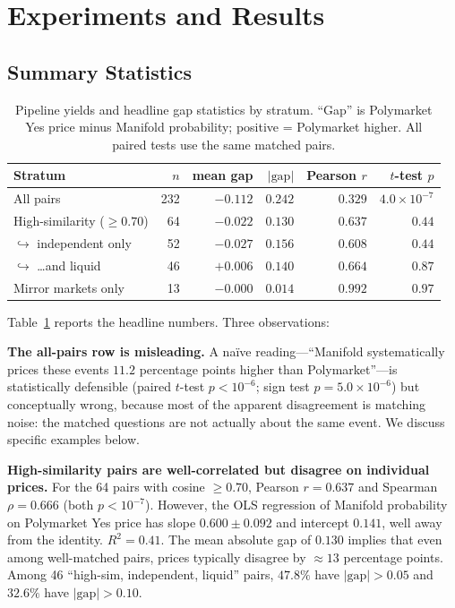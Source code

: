 \documentclass{article}
\begin{document}
\section{Experiments and Results}

\subsection{Summary Statistics}

\begin{table}[t]
\centering
\caption{Pipeline yields and headline gap statistics by stratum. ``Gap'' is Polymarket Yes price minus Manifold probability; positive = Polymarket higher. All paired tests use the same matched pairs.}
\label{tab:counts}
\begin{tabular}{lrrrrr}
\toprule
Stratum & $n$ & mean gap & $|\text{gap}|$ & Pearson $r$ & $t$-test $p$ \\
\midrule
All pairs & 232 & $-0.112$ & $0.242$ & $0.329$ & $4.0\!\times\!10^{-7}$ \\
High-similarity ($\geq 0.70$) & 64 & $-0.022$ & $0.130$ & $0.637$ & $0.44$ \\
\quad $\hookrightarrow$ independent only & 52 & $-0.027$ & $0.156$ & $0.608$ & $0.44$ \\
\quad $\hookrightarrow$ \dots and liquid & 46 & $+0.006$ & $0.140$ & $0.664$ & $0.87$ \\
Mirror markets only & 13 & $-0.000$ & $0.014$ & $0.992$ & $0.97$ \\
\bottomrule
\end{tabular}
\end{table}

Table~\ref{tab:counts} reports the headline numbers. Three observations:

\textbf{The all-pairs row is misleading.} A naïve reading---``Manifold systematically prices these events $11.2$ percentage points higher than Polymarket''---is statistically defensible (paired $t$-test $p < 10^{-6}$; sign test $p = 5.0 \times 10^{-6}$) but conceptually wrong, because most of the apparent disagreement is matching noise: the matched questions are not actually about the same event. We discuss specific examples below.

\textbf{High-similarity pairs are well-correlated but disagree on individual prices.} For the 64 pairs with cosine $\geq 0.70$, Pearson $r = 0.637$ and Spearman $\rho = 0.666$ (both $p < 10^{-7}$). However, the OLS regression of Manifold probability on Polymarket Yes price has slope $0.600 \pm 0.092$ and intercept $0.141$, well away from the identity. $R^2 = 0.41$. The mean absolute gap of $0.130$ implies that even among well-matched pairs, prices typically disagree by $\approx 13$ percentage points. Among 46 ``high-sim, independent, liquid'' pairs, $47.8\%$ have $|\text{gap}| > 0.05$ and $32.6\%$ have $|\text{gap}| > 0.10$.
\end{document}
